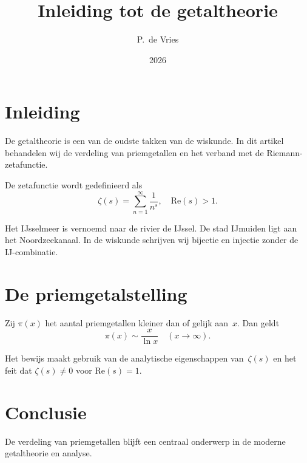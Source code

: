 \documentclass{article}
\title{Inleiding tot de getaltheorie}
\author{P.~de Vries}
\date{2026}
\begin{document}
\maketitle

\section{Inleiding}

De getaltheorie is een van de oudste takken van de wiskunde.  In dit artikel
behandelen wij de verdeling van priemgetallen en het verband met de
Riemann-zetafunctie.

De zetafunctie wordt gedefinieerd als
\[
  \zeta(s) = \sum_{n=1}^{\infty} \frac{1}{n^s}, \quad \text{Re}(s) > 1.
\]

Het IJsselmeer is vernoemd naar de rivier de IJssel.  De stad IJmuiden ligt
aan het Noordzeekanaal.  In de wiskunde schrijven wij bijectie en injectie
zonder de IJ-combinatie.

\section{De priemgetalstelling}

\begin{theorem}
Zij $\pi(x)$ het aantal priemgetallen kleiner dan of gelijk aan~$x$.  Dan geldt
\[
  \pi(x) \sim \frac{x}{\ln x} \quad (x \to \infty).
\]
\end{theorem}

Het bewijs maakt gebruik van de analytische eigenschappen van~$\zeta(s)$ en
het feit dat $\zeta(s) \ne 0$ voor $\text{Re}(s) = 1$.

\section{Conclusie}

De verdeling van priemgetallen blijft een centraal onderwerp in de moderne
getaltheorie en analyse.
\end{document}
